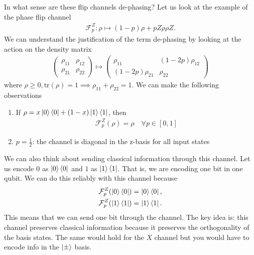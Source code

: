 \documentclass[10pt,oneside,longbibliography]{report}
\begin{document}
In what sense are these flip channels de-phasing? Let us look at the example of the phase flip channel
\begin{align}
    \mathcal{F}_{p}^{Z}: \rho \mapsto (1-p)\rho + p Z\rho \rho Z.
\end{align}
We can understand the justification of the term de-phasing by looking at the action on the density matrix
\begin{align}
    \begin{pmatrix}
    \rho_{11} & \rho_{12}\\
    \rho_{21} & \rho_{22}
    \end{pmatrix} \mapsto 
    \begin{pmatrix}
    \rho_{11} & (1-2p)\rho_{12}\\
    (1-2p)\rho_{21} & \rho_{22}
    \end{pmatrix}
\end{align}
where $\rho \geq 0, \text{tr}(\rho)=1 \implies \rho_{11}+\rho_{22}=1$. We can make the following observations
\begin{enumerate}
     \item If $\rho = x \ket{0}\bra{0} + (1-x)\ket{1}\bra{1}$, then 
     \begin{align}
         \mathcal{F}_p^Z(\rho)=\rho \quad \forall p\in [0,1]
     \end{align}
     \item $p=\frac{1}{2}$: the channel is diagonal in the z-basis for all input states
\end{enumerate}
We can also think about sending classical information through this channel. Let us encode $0$ as $\ket{0}\bra{0}$ and $1$ as $\ket{1}\bra{1}$. That is, we are encoding one bit in one qubit. We can do this reliably with this channel because
\begin{align}
    \mathcal{F}_p^Z (\ket{0}\bra{0}) &= \ket{0}\bra{0}, \\
     \mathcal{F}_p^Z (\ket{1}\bra{1}) &= \ket{1}\bra{1}.
\end{align}
This means that we can send one bit through the channel. The key idea is: this channel preserves classical information because it preserves the orthogonality of the basis states. The same would hold for the $X$ channel but you would have to encode info in the $\ket{\pm}$ basis. 
\end{document}

